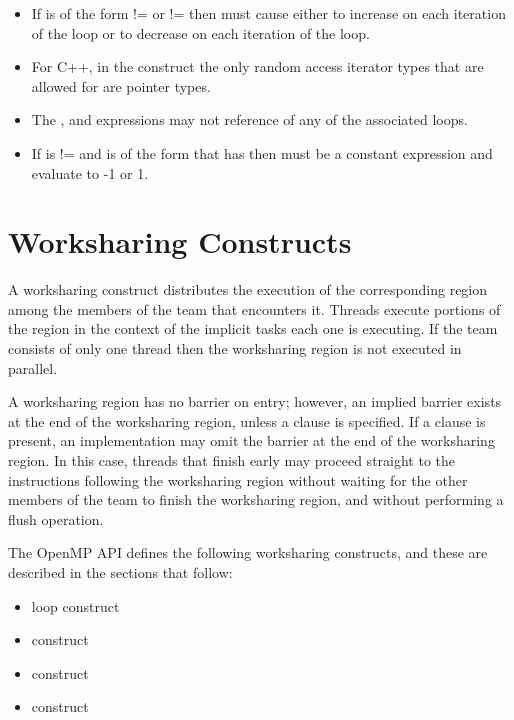 \begin{ccppspecific}
\begin{itemize}
    \item If  is of the form  !=  or
     !=  then  must cause 
    either to increase on each iteration of the loop or to decrease on
    each iteration of the loop.

    \item For C++, in the  construct the only random access iterator types that are
    allowed for  are pointer types.

    \item The ,  and  expressions may not reference
     of any of the associated loops.

    \item If  is != and  is of the
    form that has  then  must be a constant expression and
    evaluate to -1 or 1.
\end{itemize}
\end{ccppspecific}





\section{Worksharing Constructs}
\label{sec:Worksharing Constructs}
A worksharing construct distributes the execution of the corresponding region among the
members of the team that encounters it. Threads execute portions of the region in the
context of the implicit tasks each one is executing. If the team consists of only one
thread then the worksharing region is not executed in parallel.

A worksharing region has no barrier on entry; however, an implied barrier exists at the
end of the worksharing region, unless a  clause is specified. If a 
clause is present, an implementation may omit the barrier at the end of the worksharing
region. In this case, threads that finish early may proceed straight to the instructions
following the worksharing region without waiting for the other members of the team to
finish the worksharing region, and without performing a flush operation.

The OpenMP API defines the following worksharing constructs, and these are described
in the sections that follow:

\begin{itemize}
\item loop construct

\item {} construct

\item {} construct

\item {} construct
\end{itemize}

